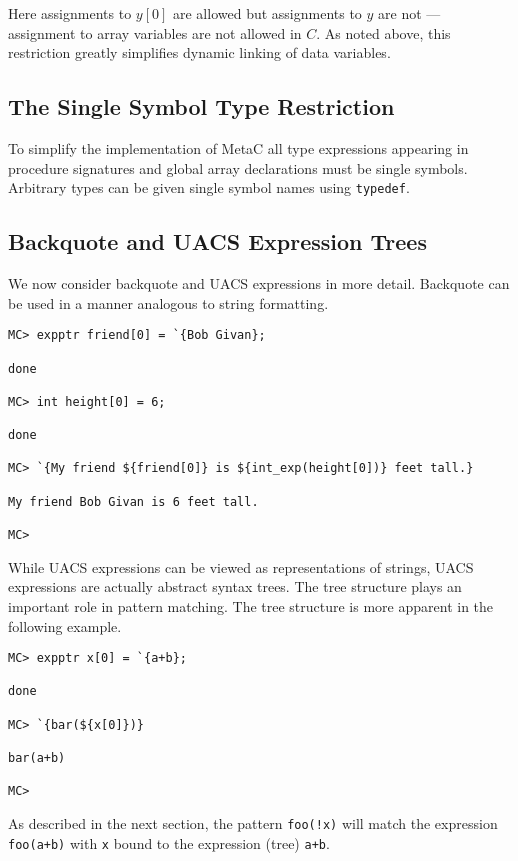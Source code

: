 \documentclass{article}
\begin{document}
Here assignments to $y[0]$ are allowed but assignments to $y$ are not --- assignment to array variables
are not allowed in $C$. As noted above, this restriction greatly simplifies dynamic linking of data variables.

\subsection{The Single Symbol Type Restriction}

To simplify the implementation of MetaC all type expressions appearing in procedure signatures and global array declarations must be single symbols.
Arbitrary types can be given single symbol names using {\tt typedef}.

\subsection{Backquote and UACS Expression Trees}

We now consider backquote and UACS expressions in more detail.  Backquote can be used in a manner analogous to string formatting.

\begin{verbatim}
MC> expptr friend[0] = `{Bob Givan};

done

MC> int height[0] = 6;

done

MC> `{My friend ${friend[0]} is ${int_exp(height[0])} feet tall.}

My friend Bob Givan is 6 feet tall.

MC> 
\end{verbatim}

While UACS expressions can be viewed as representations of strings, UACS
expressions are actually abstract syntax trees. The tree structure
plays an important role in pattern matching. The tree structure is
more apparent in the following example.

\begin{verbatim}
MC> expptr x[0] = `{a+b};

done

MC> `{bar(${x[0]})}

bar(a+b)

MC>
\end{verbatim}

As described in the next section, the pattern {\tt foo(!x)} will match the expression {\tt foo(a+b)} with {\tt x} bound to the expression (tree) {\tt a+b}.
\end{document}
